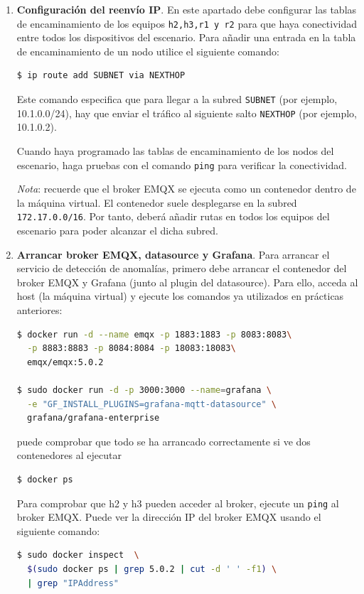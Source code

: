 \documentclass{upmassignment} \usepackage[spanish]{babel} \usepackage{ifthen} \usepackage{amsmath} \usepackage{amsfonts} \usepackage{booktabs}
\begin{document}
\begin{enumerate}[label=\textbf{Actividad {{\arabic*}}}]
\item \textbf{Configuración del reenvío IP}. En este apartado debe configurar las tablas de encaminamiento de los equipos \texttt{h2,h3,r1 y r2} para que haya conectividad entre todos los dispositivos del escenario. Para añadir una entrada en la tabla de encaminamiento de un nodo utilice el siguiente comando:



\begin{lstlisting}[language=bash]
$ ip route add SUBNET via NEXTHOP
\end{lstlisting}
Este comando especifica que para
llegar a la subred \texttt{SUBNET}
(por ejemplo, 10.1.0.0/24), hay que enviar el tráfico al siguiente salto \texttt{NEXTHOP} (por ejemplo, 10.1.0.2).

Cuando haya programado las tablas de encaminamiento de los nodos del escenario, haga pruebas con el comando \texttt{ping} para verificar la conectividad. 

\emph{Nota}: recuerde que el broker
EMQX se ejecuta como un contenedor
dentro de la máquina virtual.
El contenedor suele desplegarse en la
subred \texttt{172.17.0.0/16}.
Por tanto, deberá añadir rutas en todos
los equipos del escenario para poder
alcanzar el dicha subred.


\item \textbf{Arrancar broker EMQX, datasource y Grafana}. Para arrancar el servicio de detección de anomalías, primero debe
arrancar el contenedor del broker EMQX
y Grafana (junto al plugin del datasource).
Para ello, acceda al host (la máquina
virtual) y ejecute los comandos
ya utilizados en prácticas anteriores:
\begin{lstlisting}[language=bash]
$ docker run -d --name emqx -p 1883:1883 -p 8083:8083\
  -p 8883:8883 -p 8084:8084 -p 18083:18083\
  emqx/emqx:5.0.2

$ sudo docker run -d -p 3000:3000 --name=grafana \
  -e "GF_INSTALL_PLUGINS=grafana-mqtt-datasource" \
  grafana/grafana-enterprise
\end{lstlisting}
puede comprobar que todo se ha arrancado
correctamente si ve dos contenedores
al ejecutar
\begin{lstlisting}[language=bash]
$ docker ps
\end{lstlisting}

Para comprobar que h2 y h3 pueden
acceder al broker,
ejecute un \texttt{ping}
al broker EMQX.
Puede ver la dirección IP del broker
EMQX usando el siguiente comando:
\begin{lstlisting}[language=bash]
$ sudo docker inspect  \ 
  $(sudo docker ps | grep 5.0.2 | cut -d ' ' -f1) \ 
  | grep "IPAddress"
\end{lstlisting}


\end{enumerate}
\end{document}
